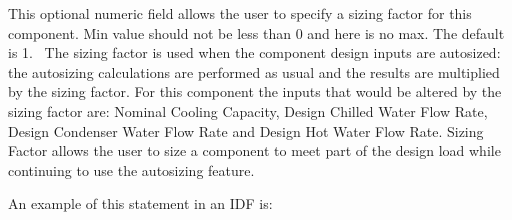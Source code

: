 This optional numeric field allows the user to specify a sizing factor for this component. Min value should not be less than 0 and here is no max. The default is 1.~ The sizing factor is used when the component design inputs are autosized: the autosizing calculations are performed as usual and the results are multiplied by the sizing factor. For this component the inputs that would be altered by the sizing factor are: Nominal Cooling Capacity, Design Chilled Water Flow Rate, Design Condenser Water Flow Rate and Design Hot Water Flow Rate. Sizing Factor allows the user to size a component to meet part of the design load while continuing to use the autosizing feature.

An example of this statement in an IDF is:

\begin{lstlisting}


\end{lstlisting}
